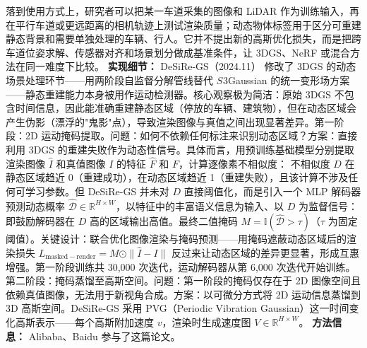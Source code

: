 落到使用方式上，研究者可以把某一车道采集的图像和 LiDAR 作为训练输入，再在平行车道或更远距离的相机轨迹上测试渲染质量；动态物体标签用于区分可重建静态背景和需要单独处理的车辆、行人。它并不提出新的高斯优化损失，而是把跨车道位姿求解、传感器对齐和场景划分做成基准条件，让 3DGS、NeRF 或混合方法在同一难度下比较。
\textbf{实现细节：} DeSiRe-GS（2024.11） 修改了 3DGS 的动态场景处理环节——用两阶段自监督分解管线替代 $S^{}3$Gaussian 的统一变形场方案——静态重建能力本身被用作运动检测器。核心观察极为简洁：原始 3DGS 不包含时间信息，因此能准确重建静态区域（停放的车辆、建筑物），但在动态区域会产生伪影（漂浮的"鬼影"点），导致渲染图像与真值之间出现显著差异。第一阶段：2D 运动掩码提取。问题：如何不依赖任何标注来识别动态区域？方案：直接利用 3DGS 的重建失败作为动态性信号。具体而言，用预训练基础模型分别提取渲染图像 $\hat{I}$ 和真值图像 $I$ 的特征 $\hat{F}$ 和 $F$，计算逐像素不相似度： 不相似度 $D$ 在静态区域趋近 0（重建成功），在动态区域趋近 1（重建失败），且该计算不涉及任何可学习参数。但 DeSiRe-GS 并未对 $D$ 直接阈值化，而是引入一个 MLP 解码器预测动态概率 $\hat{\mathcal{D}} \in \mathbb{R}^{H \times W}$，以特征中的丰富语义信息为输入、以 $D$ 为监督信号： 即鼓励解码器在 $D$ 高的区域输出高值。最终二值掩码 $M = \mathbb{I}(\hat{\mathcal{D}} > \tau)$（$\tau$ 为固定阈值）。关键设计：联合优化图像渲染与掩码预测——用掩码遮蔽动态区域后的渲染损失 $L_{\mathrm{masked-render}} = M \odot \|\hat{I} - I\|$ 反过来让动态区域的差异更显著，形成互惠增强。第一阶段训练共 30,000 次迭代，运动解码器从第 6,000 次迭代开始训练。第二阶段：掩码蒸馏至高斯空间。问题：第一阶段的掩码仅存在于 2D 图像空间且依赖真值图像，无法用于新视角合成。方案：以可微分方式将 2D 运动信息蒸馏到 3D 高斯空间。DeSiRe-GS 采用 PVG（Periodic Vibration Gaussian）这一时间变化高斯表示——每个高斯附加速度 $v$，渲染时生成速度图 $V \in \mathbb{R}^{H \times W}$。
\textbf{方法信息：} Alibaba、Baidu 参与了这篇论文。
